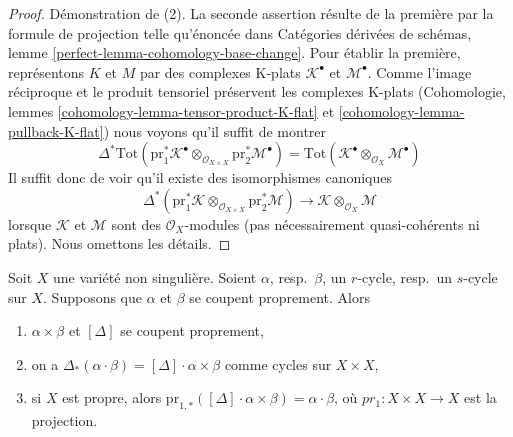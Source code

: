 \begin{proof}
\medskip\noindent
Démonstration de (2). La seconde assertion résulte de la première par la
formule de projection telle qu'énoncée dans
Catégories dérivées de schémas, lemme \ref{perfect-lemma-cohomology-base-change}.
Pour établir la première, représentons $K$ et $M$ par des complexes K-plats
$\mathcal{K}^\bullet$ et $\mathcal{M}^\bullet$.
Comme l'image réciproque et le produit tensoriel préservent les complexes K-plats
(Cohomologie, lemmes \ref{cohomology-lemma-tensor-product-K-flat} et
\ref{cohomology-lemma-pullback-K-flat})
nous voyons qu'il suffit de montrer
$$
\Delta^*\text{Tot}(
\text{pr}_1^*\mathcal{K}^\bullet
\otimes_{\mathcal{O}_{X \times X}} \text{pr}_2^*\mathcal{M}^\bullet)
=
\text{Tot}(
\mathcal{K}^\bullet \otimes_{\mathcal{O}_X} \mathcal{M}^\bullet)
$$
Il suffit donc de voir qu'il existe des isomorphismes canoniques
$$
\Delta^*(\text{pr}_1^*\mathcal{K}
\otimes_{\mathcal{O}_{X \times X}} \text{pr}_2^*\mathcal{M})
\longrightarrow
\mathcal{K} \otimes_{\mathcal{O}_X} \mathcal{M}
$$
lorsque $\mathcal{K}$ et $\mathcal{M}$ sont des $\mathcal{O}_X$-modules
(pas nécessairement quasi-cohérents ni plats).
Nous omettons les détails.
\end{proof}

\begin{lemma}
\label{lemma-reduction-diagonal}
Soit $X$ une variété non singulière. Soient $\alpha$, resp.\ $\beta$,
un $r$-cycle, resp.\ un $s$-cycle sur $X$. Supposons que $\alpha$ et $\beta$
se coupent proprement. Alors
\begin{enumerate}
\item $\alpha \times \beta$ et $[\Delta]$ se coupent proprement,
\item on a $\Delta_*(\alpha \cdot \beta) = [\Delta] \cdot \alpha\times\beta$
comme cycles sur $X \times X$,
\item si $X$ est propre, alors
$\text{pr}_{1, *}([\Delta] \cdot \alpha\times\beta) = \alpha\cdot\beta$,
où $pr_1 : X\times X \to X$ est la projection.
\end{enumerate}
\end{lemma}

